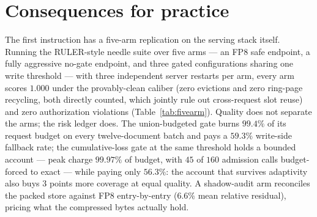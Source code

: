 \documentclass[11pt]{article}
\renewcommand{\_}{\WCorigunderscore\allowbreak}
\begin{document}
\section{Consequences for practice}
\label{sec:consequences}
The first instruction has a five-arm replication on the serving stack
itself. Running the RULER-style needle suite over five arms --- an FP8
safe endpoint, a fully aggressive no-gate endpoint, and three gated
configurations sharing one write threshold --- with three independent
server restarts per arm, every arm scores $1.000$ under the
provably-clean caliber (zero evictions and zero ring-page recycling,
both directly counted, which jointly rule out cross-request slot reuse)
and zero authorization violations (Table~\ref{tab:fivearm}). Quality
does not separate the arms; the risk ledger does. The union-budgeted
gate burns $99.4\%$ of its request budget on every twelve-document
batch and pays a $59.3\%$ write-side fallback rate; the
cumulative-loss gate at the same threshold holds a bounded account ---
peak charge $99.97\%$ of budget, with $45$ of $160$ admission calls
budget-forced to exact --- while paying only $56.3\%$: the account
that survives adaptivity also buys $3$ points more coverage at equal
quality. A shadow-audit arm reconciles the packed store against FP8
entry-by-entry ($6.6\%$ mean relative residual), pricing what the
compressed bytes actually hold.
\end{document}
